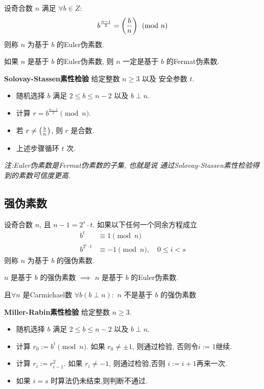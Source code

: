 \begin{definition}[Euler伪素数]
    设奇合数 \(n\) 满足 \(\forall b \in Z:\)
    \[b^{\frac{n-1}{2}} = \left(\frac{b}{n}\right) \pmod{n}\]
    则称 \(n\) 为基于 \(b\) 的Euler伪素数.
\end{definition}

\begin{definition}[Euler伪素数的性质]
    如果 \(n\) 是基于 \(b\) 的Euler伪素数, 则
    \(n\) 一定是基于 \(b\) 的Fermat伪素数.
\end{definition}

\textbf{Solovay-Stassen素性检验} \hspace{1em} 给定整数 \(n \ge 3\) 以及
安全参数 \(t\).
\begin{itemize}
    \item 随机选择 \(b\) 满足 \(2 \le b \le n-2\) 以及 \(b \perp n\).
    \item 计算 \(r = b^{\frac{n-1}{2}} \pmod{n}\).
    \item 若 \(r \ne \left(\frac{b}{n}\right)\), 则 \(r\) 是合数.
    \item 上述步骤循环 \(t\) 次.
\end{itemize}

\textit{注:Euler伪素数是Fermat伪素数的子集, 也就是说
通过Solovay-Stassen素性检验得到的素数可信度更高.}

\subsection{强伪素数}

\begin{definition}[强伪素数]
    设奇合数 \(n\), 且 \(n - 1 = 2^s \cdot t\).
    如果以下任何一个同余方程成立
    \begin{align*}
        b^t &\equiv 1 \pmod{n} \\
        b^{2^i \cdot t} &\equiv -1 \pmod{n}, \quad 0 \le i < s
    \end{align*}
    则称 \(n\) 为基于 \(b\) 的强伪素数.
\end{definition}

\begin{theorem}[强伪素数为什么是神]
    \(n\) 是基于 \(b\) 的强伪素数 \(\implies\) 
    \(n\) 是基于 \(b\) 的Euler伪素数. 
    
    且\(\forall n\) 是Carmichael数
    \(\forall b(b \perp n):\) \(n\) 不是基于 \(b\)
    的强伪素数
\end{theorem}

\textbf{Miller-Rabin素性检验} \hspace{1em} 给定整数 \(n \ge 3\).
\begin{itemize}
    \item 随机选择 \(b\) 满足 \(2 \le b \le n-2\) 以及 \(b \perp n\).
    \item 计算 \(r_0 := b^t \pmod{n}\). 如果 \(r_0 \ne \pm 1\), 则通过检验, 否则令\(i := 1\)继续.
    \item 计算 \(r_i := r_{i-1}^2\). 如果 \(r_i \ne -1\), 则通过检验,否则 \(i := i+1\)再来一次.
    \item 如果 \(i = s\) 时算法仍未结束,则判断不通过.
\end{itemize}